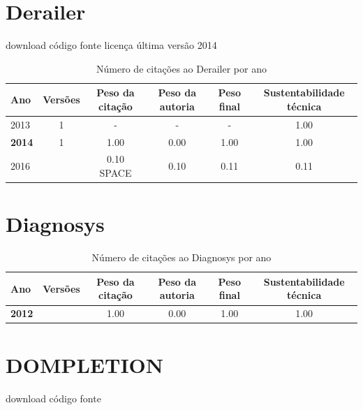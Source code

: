 \section{Derailer}
\checkmark download
\checkmark código fonte
\checkmark licença
\checkmark última versão 2014


\begin{table}[H]
\caption{Número de citações ao Derailer por ano}
\centering
\begin{tabular}{| l | c | c | c | c | c |}
  \hline
  Ano & Versões & Peso da citação & Peso da autoria & Peso final & Sustentabilidade técnica \\
  \hline
        2013 & 1 & - & - & -
        &
          {\color{blue} 1.00}
        \\
\hline
            {\bf 2014}
          &
          1
          &
          1.00
          &
          0.00
          &
          1.00
          &
            {\color{blue} 1.00}
          \\
\hline
            2016
          &
          
          &
          0.10
            {\tiny SPACE}
          &
          0.10
          &
          0.11
          &
            {\color{red} 0.11}
          \\
\hline
\end{tabular}
\end{table}



\section{Diagnosys}


\begin{table}[H]
\caption{Número de citações ao Diagnosys por ano}
\centering
\begin{tabular}{| l | c | c | c | c | c |}
  \hline
  Ano & Versões & Peso da citação & Peso da autoria & Peso final & Sustentabilidade técnica \\
  \hline
            {\bf 2012}
          &
          
          &
          1.00
          &
          0.00
          &
          1.00
          &
            {\color{blue} 1.00}
          \\
\hline
\end{tabular}
\end{table}



\section{DOMPLETION}
\checkmark download
\checkmark código fonte


